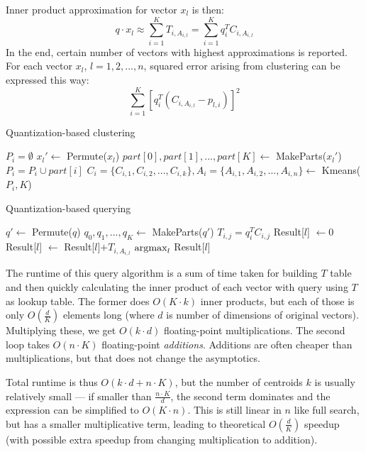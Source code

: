 Inner product approximation for vector $x_l$ is then:
$$q \cdot x_l \approx \sum_{i=1}^{K} T_{i,A_{i,l}} = \sum_{i=1}^{K} q_i^T C_{i,A_{i,l}}$$
In the end, certain number of vectors with highest approximations is reported.
For each vector $x_l$, $l = 1,2,...,n$, squared error arising from clustering can be expressed this way:
$$ \sum_{i=1}^{K}  [q_{i}^{T} (C_{i, A_{i,l}} - p_{l,i})]^2$$

\begin{algorithm}
	\caption{Quantization-based clustering}
	\begin{algorithmic}
			\State $P_i = \emptyset$
		\EndFor
			\State $x_l' \gets$ Permute($x_l$)
			\State $part[0], part[1], ..., part[K] \gets$ MakeParts($x_l'$)
				\State $P_i = P_i \cup part[i]$
			\EndFor
		\EndFor
			\State $C_i = \{C_{i,1}, C_{i,2}, ..., C_{i,k}\}, A_i = \{A_{i,1}, A_{i,2}, ..., A_{i,n}\} \gets$ Kmeans($P_i, K$)
		\EndFor
	\end{algorithmic}
\end{algorithm}

\begin{algorithm}
	\caption{Quantization-based querying}
	\begin{algorithmic}
		\State $q' \gets$ Permute($q$)
		\State $q_0, q_1, ..., q_K \gets$ MakeParts($q'$)
		\For{$i = 0, 1, ..., K$}
			\For{$j = 0, 1, ..., k$}
				\State $T_{i,j} = q_i^T C_{i,j}$
			\EndFor
		\EndFor
		\For{$l = 0, 1, ..., n$}
			\State Result[$l$] $\gets 0$
			\For{$i = 0, 1, ..., K$}
				\State Result[$l$] $\gets$ Result[$l$]$+ T_{i,A_{i,l}}$
			\EndFor
		\EndFor
		\State \Return $\operatorname*{argmax}_{l}$ Result[$l$]
	\end{algorithmic}
\end{algorithm}

The runtime of this query algorithm is a sum of time taken for building $T$ table and then
quickly calculating the inner product of each vector with query using $T$ as lookup table.
The former does $O(K \cdot k)$ inner products, but each of those is only $O(\frac{d}{K})$
elements long (where $d$ is number of dimensions of original vectors). 
Multiplying these, we get $O(k \cdot d)$ floating-point multiplications.
The second loop takes $O(n \cdot K)$ floating-point \textit{additions}. Additions are often
cheaper than multiplications, but that does not change the asymptotics.

Total runtime is thus $O(k \cdot d + n \cdot K)$, but the number of centroids $k$ is usually 
relatively small --- if smaller than $\frac{n \cdot K}{d}$, the second term dominates 
and the expression can be simplified to
$O(K \cdot n)$. This is still linear in $n$ like full search, but has a smaller multiplicative
term, leading to theoretical $O(\frac{d}{K})$ speedup (with possible extra speedup from changing
multiplication to addition).
